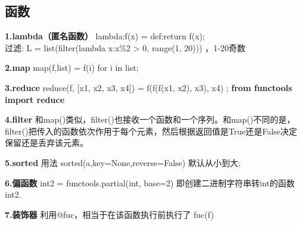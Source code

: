 \documentclass[11pt]{article}
\begin{document}
    \hypertarget{ux51fdux6570}{%
\subsection{函数}\label{ux51fdux6570}}

\textbf{1.lambda（匿名函数）} lambda:f(x) = def:return f(x);\\
过滤: L = list(filter(lambda x:x\%2 \textgreater{} 0, range(1, 20)))
，1-20奇数

\textbf{2.map} map(f,list) = f(i) for i in list;

\textbf{3.reduce} reduce(f, {[}x1, x2, x3, x4{]}) = f(f(f(x1, x2), x3),
x4) ; \textbf{from functools import reduce}

\textbf{4.filter}
和map()类似，filter()也接收一个函数和一个序列。和map()不同的是，filter()把传入的函数依次作用于每个元素，然后根据返回值是True还是False决定保留还是丢弃该元素。

\textbf{5.sorted} 用法 sorted(a,key=None,reverse=False) 默认从小到大;

\textbf{6.偏函数} int2 = functools.partial(int, base=2)
即创建二进制字符串转int的函数int2.

\textbf{7.装饰器} 利用@fuc，相当于在该函数执行前执行了 fuc(f)
\end{document}
